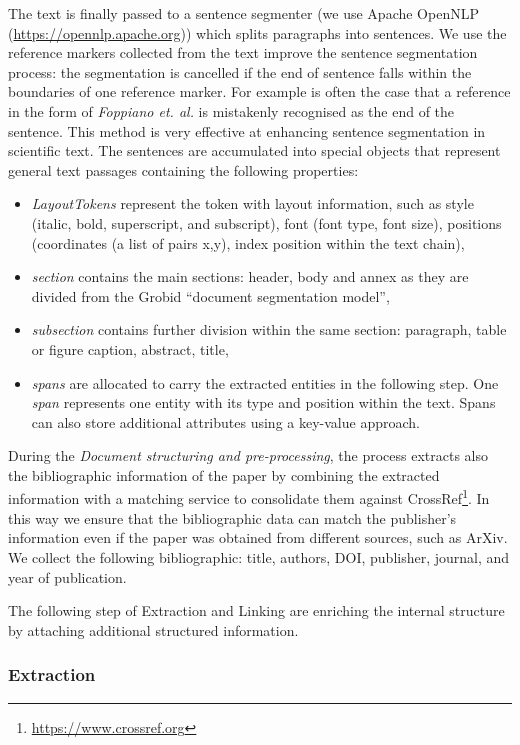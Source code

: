 \documentclass{article}
\begin{document}
The text is finally passed to a sentence segmenter (we use Apache OpenNLP (\url{https://opennlp.apache.org})) which splits paragraphs into sentences. We use the reference markers collected from the text improve the sentence segmentation process: the segmentation is cancelled if the end of sentence falls within the boundaries of one reference marker. For example is often the case that a reference in the form of \textit{Foppiano et. al.} is mistakenly recognised as the end of the sentence. This method is very effective at enhancing sentence segmentation in scientific text. 
The sentences are accumulated into special objects that represent general text passages containing the following properties: 
\begin{itemize}
    \item \textit{LayoutTokens} represent the token with layout information, such as style (italic, bold, superscript, and subscript), font (font type, font size), positions (coordinates (a list of pairs x,y), index position within the text chain), 
    \item \textit{section} contains the main sections: header, body and annex as they are divided from the Grobid ``document segmentation model'', 
    \item \textit{subsection} contains further division within the same section: paragraph, table or figure caption, abstract, title, 
    \item \textit{spans} are allocated to carry the extracted entities in the following step. One \textit{span} represents one entity with its type and position within the text. Spans can also store additional attributes using a key-value approach.
\end{itemize}

During the \textit{Document structuring and pre-processing}, the process extracts also the bibliographic information of the paper by combining the extracted information with a matching service to consolidate them against CrossRef\footnote{\url{https://www.crossref.org}}. In this way we ensure that the bibliographic data can match the publisher's information even if the paper was obtained from different sources, such as ArXiv. We collect the following bibliographic: title, authors, DOI, publisher, journal, and year of publication.

The following step of Extraction and Linking are enriching the internal structure by attaching additional structured information. 

\subsubsection{Extraction}
\label{subsubsec:extraction}
\end{document}
